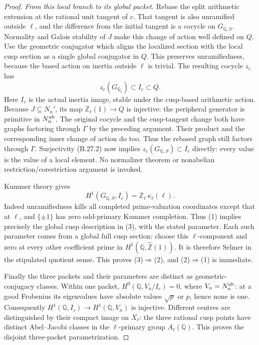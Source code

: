 \begin{proof}
\emph{From this local branch to its global packet.}
Rebase the split arithmetic extension at the
rational unit tangent of $c$.
That tangent is also unramified outside $\ell$,
and the difference from the initial tangent
is a cocycle on $G_{\mathbb Q,S}$.
Normality and Galois stability of $J$ make
this change of action well defined on $Q$.
Use the geometric conjugator which aligns
the localized section with the local cusp
section as a single global conjugator in $Q$.
This preserves unramifiedness, because the
based action on inertia outside $\ell$ is
trivial. The resulting cocycle $z_c$ has
\[
             z_c(G_{\mathbb Q_\ell})\subset I_c
                        \subset Q .
                                                               \tag{B.27.5}
\]
Here $I_c$ is the actual inertia image, stable
under the cusp-based arithmetic action.
Because $J\subseteq N_n'$, its map
$\mathbb Z_\ell(1)\to Q$ is injective:
the peripheral generator is primitive in
$N_n^{\rm ab}$.
The original cocycle and the cusp-tangent change
both have graphs factoring through $\Gamma$
by the preceding argument. Their product and
the corresponding inner change of action do too.
Thus the rebased graph still factors through
$\Gamma$. Surjectivity (B.27.2) now implies
$z_c(G_{\mathbb Q,S})\subset I_c$ directly:
every value is the value of a local element.
No normalizer theorem or nonabelian
restriction/corestriction argument is invoked.

Kummer theory gives
\[
 H^1(G_{\mathbb Q,S},I_c)
   =\mathbb Z_\ell\,\kappa_\ell(\ell).
                                                               \tag{B.27.6}
\]
Indeed unramifiedness kills all completed
prime-valuation coordinates except that at
$\ell$, and $\{\pm1\}$ has zero odd-primary
Kummer completion.
Thus (1) implies precisely the global cusp
description in (3), with the stated parameter.
Each such parameter comes from a global full
cusp section: choose this $\ell$-component
and zero at every other coefficient prime
in $H^1(\mathbb Q,\widehat{\mathbb Z}(1))$.
It is therefore Selmer in the stipulated
quotient sense. This proves (3)$\Rightarrow$(2),
and (2)$\Rightarrow$(1) is immediate.

Finally the three packets and their parameters
are distinct as geometric-conjugacy classes.
Within one packet, $H^0(\mathbb Q,V_n/I_c)=0$,
where $V_n=N_n^{\rm ab}$: at a good Frobenius
its eigenvalues have absolute values $\sqrt p$
or $p$, hence none is one.
Consequently $H^1(\mathbb Q,I_c)\to
H^1(\mathbb Q,V_n)$ is injective.
Different centres are distinguished by their
compact image on $X_\ell$: the three rational
cusp points have distinct Abel--Jacobi classes
in the $\ell$-primary group $A_\ell(\mathbb Q)$.
This proves the disjoint three-packet
parametrization.


\end{proof}
